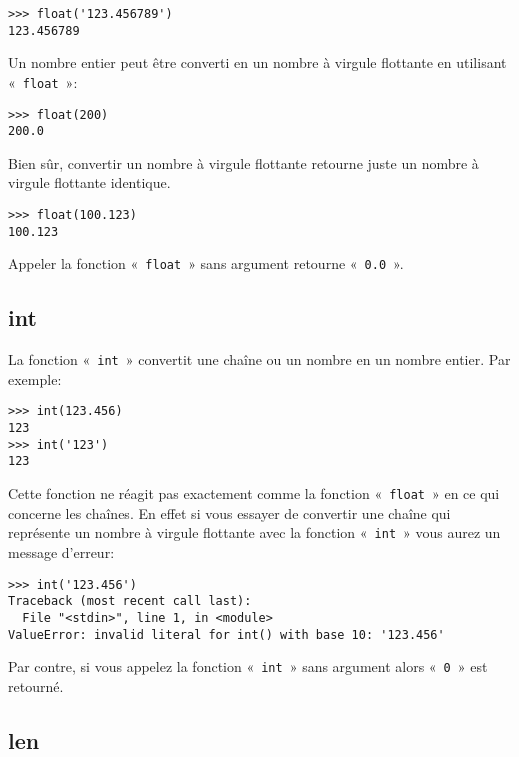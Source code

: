\begin{Verbatim}[frame=single,rulecolor=\color{gray}]
>>> float('123.456789')
123.456789
\end{Verbatim}

Un nombre entier peut être converti en un nombre à virgule flottante en utilisant «~\texttt{float}~»: 
\begin{Verbatim}[frame=single,rulecolor=\color{gray}]
>>> float(200)
200.0
\end{Verbatim}

Bien sûr, convertir un nombre à virgule flottante retourne juste un nombre à virgule flottante identique.
\begin{Verbatim}[frame=single,rulecolor=\color{gray}]
>>> float(100.123)
100.123
\end{Verbatim}

Appeler la fonction «~\texttt{float}~» sans argument retourne «~\texttt{0.0}~». 

\subsection*{int}

La fonction «~\texttt{int}~» convertit une chaîne ou un nombre en un nombre entier. Par exemple:

\begin{Verbatim}[frame=single,rulecolor=\color{gray}]
>>> int(123.456)
123
>>> int('123')
123
\end{Verbatim}

Cette fonction ne réagit pas exactement comme la fonction «~\texttt{float}~» en ce qui concerne les chaînes. En effet si vous essayer de convertir une chaîne qui représente un nombre à virgule flottante avec la fonction «~\texttt{int}~» vous aurez un message d'erreur:
\begin{Verbatim}[frame=single,rulecolor=\color{gray}]
>>> int('123.456')
Traceback (most recent call last):
  File "<stdin>", line 1, in <module>
ValueError: invalid literal for int() with base 10: '123.456'
\end{Verbatim}

Par contre, si vous appelez la fonction «~\texttt{int}~»  sans argument alors «~\texttt{0}~» est retourné.

\subsection*{len}

